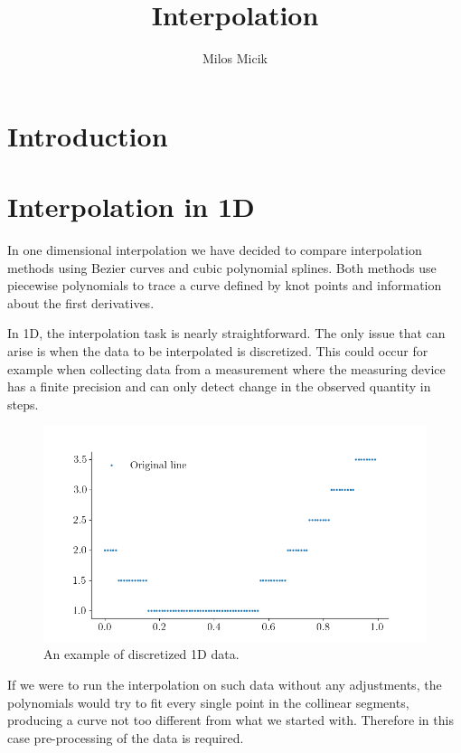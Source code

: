 \documentclass[a4paper,10pt]{report}
\title{Interpolation} %
\author{Milos Micik}
\begin{document}
\maketitle

\begin{abstract}
\end{abstract}

\chapter{Introduction}

\chapter{Interpolation in 1D}
In one dimensional interpolation we have decided to compare interpolation methods using Bezier curves and cubic polynomial splines. Both methods use piecewise polynomials to trace a curve defined by knot points and information about the first derivatives.


In 1D, the interpolation task is nearly straightforward. The only issue that can arise is when the data to be interpolated is discretized. This could occur for example when collecting data from a measurement where the measuring device has a finite precision and can only detect change in the observed quantity in steps.
\begin{figure}[h]
 \centering
 \includegraphics[width=.6\textwidth]{../images/1D_Function.png}
 \caption{An example of discretized 1D data.}
 \label{fig:1D_fun}
\end{figure}

If we were to run the interpolation on such data without any adjustments, the polynomials would try to fit every single point in the collinear segments, producing a curve not too different from what we started with. Therefore in this case pre-processing of the data is required.
\end{document}
